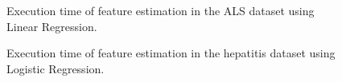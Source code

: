 \begin{figure}[h]
	\begin{subfigmatrix}{2}
	\end{subfigmatrix}
	\caption{Execution time of feature estimation in the ALS dataset using Linear Regression.}
	\label{fig:estimationtimelinear}
\end{figure}

\begin{figure}[h]
	\begin{subfigmatrix}{2}
	\end{subfigmatrix}
	\caption{Execution time of feature estimation in the hepatitis dataset using Logistic Regression.}
	\label{fig:estimationtimelog}
\end{figure}

